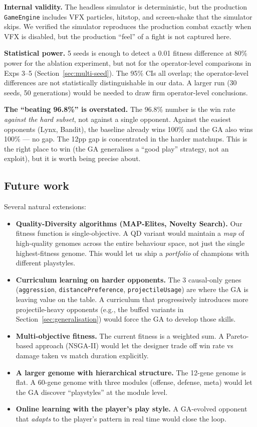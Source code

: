 \documentclass[conference]{IEEEtran}
\begin{document}
\textbf{Internal validity.} The headless simulator is deterministic, but the production \texttt{GameEngine} includes VFX particles, hitstop, and screen-shake that the simulator skips. We verified the simulator reproduces the production combat exactly when VFX is disabled, but the production ``feel'' of a fight is not captured here.

\textbf{Statistical power.} 5 seeds is enough to detect a 0.01 fitness difference at 80\% power for the ablation experiment, but not for the operator-level comparisons in Exps 3--5 (Section~\ref{sec:multi-seed}). The 95\% CIs all overlap; the operator-level differences are not statistically distinguishable in our data. A larger run (30 seeds, 50 generations) would be needed to draw firm operator-level conclusions.

\textbf{The ``beating 96.8\%'' is overstated.} The 96.8\% number is the win rate \emph{against the hard subset}, not against a single opponent. Against the easiest opponents (Lynx, Bandit), the baseline already wins 100\% and the GA also wins 100\% --- no gap. The 12pp gap is concentrated in the harder matchups. This is the right place to win (the GA generalises a ``good play'' strategy, not an exploit), but it is worth being precise about.

\subsection{Future work}

Several natural extensions:
\begin{itemize}
\item \textbf{Quality-Diversity algorithms (MAP-Elites, Novelty Search).} Our fitness function is single-objective. A QD variant would maintain a \emph{map} of high-quality genomes across the entire behaviour space, not just the single highest-fitness genome. This would let us ship a \emph{portfolio} of champions with different playstyles.
\item \textbf{Curriculum learning on harder opponents.} The 3 causal-only genes (\texttt{aggression}, \texttt{distancePreference}, \texttt{projectileUsage}) are where the GA is leaving value on the table. A curriculum that progressively introduces more projectile-heavy opponents (e.g., the buffed variants in Section~\ref{sec:generalisation}) would force the GA to develop those skills.
\item \textbf{Multi-objective fitness.} The current fitness is a weighted sum. A Pareto-based approach (NSGA-II) would let the designer trade off win rate vs damage taken vs match duration explicitly.
\item \textbf{A larger genome with hierarchical structure.} The 12-gene genome is flat. A 60-gene genome with three modules (offense, defense, meta) would let the GA discover ``playstyles'' at the module level.
\item \textbf{Online learning with the player's play style.} A GA-evolved opponent that \emph{adapts} to the player's pattern in real time would close the loop.
\end{itemize}
\end{document}
